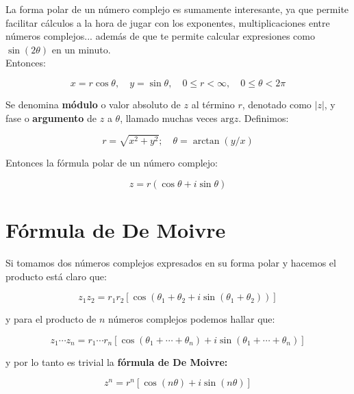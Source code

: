 \documentclass[12pt]{book}
\newcommand{\Arg}{\mathrm{arg}}
\begin{document}
La forma polar de un número complejo es sumamente interesante, ya que permite facilitar cálculos a la hora de jugar con los exponentes, multiplicaciones entre números complejos... además de que te permite calcular expresiones como $\sin (2 \theta)$ en un minuto. \\

Entonces: 

\begin{equation}
x = r \cos \theta, \quad y = \sin \theta, \quad 0 \leq r < \infty, \quad 0 \leq \theta < 2 \pi
\end{equation}

Se denomina \textbf{módulo} o valor absoluto de $z$ al término $r$, denotado como $|z|$, y fase o \textbf{argumento} de $z$ a $\theta$, llamado muchas veces $\Arg{z}$. Definimos:

\begin{equation}
r = \sqrt{x^2 + y^2}; \quad \theta = \arctan (y/x)
\end{equation}

Entonces la fórmula polar de un número complejo:

\begin{equation}
z = r(\cos \theta + i \sin \theta)
\end{equation}

\section{Fórmula de De Moivre}

Si tomamos dos números complejos expresados en su forma polar y hacemos el producto está claro que:

\begin{equation}
z_1 z_2  = r_1 r_2 [\cos (\theta_1 + \theta_2 + i \sin (\theta_1 + \theta_2))]
\end{equation}

y para el producto de $n$ números complejos podemos hallar que:

\begin{equation}
z_1 \cdots z_n = r_1 \cdots r_n [\cos (\theta_1 + \cdots + \theta_n ) + i \sin(\theta_1 + \cdots + \theta_n )]
\end{equation}

y por lo tanto es trivial la \textbf{fórmula de De Moivre:}

\begin{equation}
z^n = r^n [\cos(n \theta)+i\sin(n \theta)]
\end{equation}
\end{document}
